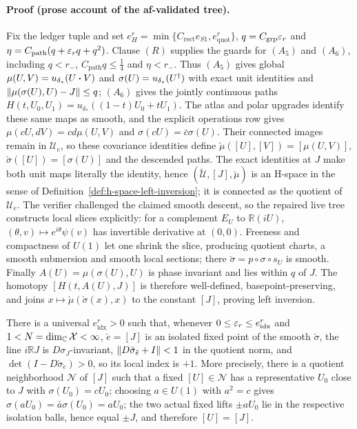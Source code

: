 \paragraph{Proof (prose account of the af-validated tree).}
Fix the ledger tuple and set $e_H^r=\min\{C_{\mathrm{rect}}e_{S1},e_{\mathrm{quot}}^r\}$,
$q=C_{\mathrm{grp}}\varepsilon_r$ and
$\eta=C_{\mathrm{path}}(q+\varepsilon_rq+q^2)$.
Clause $(R)$ supplies the guards for $(A_5)$ and $(A_6)$, including
$q<r_-$, $C_{\mathrm{path}}q\le\tfrac14$ and $\eta<r_-$.
Thus $(A_5)$ gives global $\mu(U,V)=u_{\delta_*}(U\mathbin{\bm{\cdot}} V)$ and
$\sigma(U)=u_{\delta_*}(U^{\dagger})$ with exact unit identities and
$\lVert \mu(\sigma(U),U)-J\rVert\le q$; $(A_6)$ gives the jointly continuous paths
$H(t,U_0,U_1)=u_{\delta_*}((1-t)U_0+tU_1)$.
The atlas and polar upgrades identify these same maps as smooth, and the explicit
operations row gives $\mu(cU,dV)=cd\mu(U,V)$ and
$\sigma(cU)=\bar c\sigma(U)$.
Their connected images remain in $\mathcal U_e$, so these covariance identities define
$\breve\mu([U],[V])=[\mu(U,V)]$, $\breve\sigma([U])=[\sigma(U)]$ and the descended paths.
The exact identities at $J$ make both unit maps literally the identity, hence
$(\breve{\mathcal U},[J],\breve\mu)$ is an H-space in the sense of
Definition~\ref{def:h-space-left-inversion}; it is connected as the quotient of
$\mathcal U_e$.
The verifier challenged the claimed smooth descent, so the repaired live tree constructs
local slices explicitly: for a complement $E_U$ to $\mathbb R(iU)$,
$(\theta,v)\mapsto e^{i\theta}\psi(v)$ has invertible derivative at $(0,0)$.
Freeness and compactness of $U(1)$ let one shrink the slice, producing quotient charts,
a smooth submersion and smooth local sections; there
$\breve\sigma=p\circ\sigma\circ s_U$ is smooth.
Finally $A(U)=\mu(\sigma(U),U)$ is phase invariant and lies within $q$ of $J$.
The homotopy $[H(t,A(U),J)]$ is therefore well-defined, basepoint-preserving, and joins
$x\mapsto\breve\mu(\breve\sigma(x),x)$ to the constant $[J]$, proving left inversion.

\begin{lemma}\label{lem:stage1-quotient-inversion-index-data}
There is a universal $e^{r}_{\mathrm{idx}}>0$ such that, whenever
$0\le\varepsilon_r\le e^{r}_{\mathrm{idx}}$ and $1<N=\dim_{\mathbb C}\mathcal X<\infty$,
$\breve e=[J]$ is an isolated fixed point of the smooth $\breve\sigma$, the line
$i\mathbb RJ$ is $D\sigma_J$-invariant,
$\lVert D\breve\sigma_{\breve e}+I\rVert<1$ in the quotient norm, and
$\det(I-D\breve\sigma_{\breve e})>0$, so its local index is $+1$.
More precisely, there is a quotient neighborhood $\mathcal N$ of $[J]$ such that a fixed
$[U]\in\mathcal N$ has a representative $U_0$ close to $J$ with $\sigma(U_0)=cU_0$; choosing $a\in U(1)$ with $a^2=c$ gives
$\sigma(aU_0)=\bar a\sigma(U_0)=aU_0$; the two actual fixed lifts $\pm aU_0$ lie in the
respective isolation balls, hence equal $\pm J$, and therefore $[U]=[J]$.
\end{lemma}

